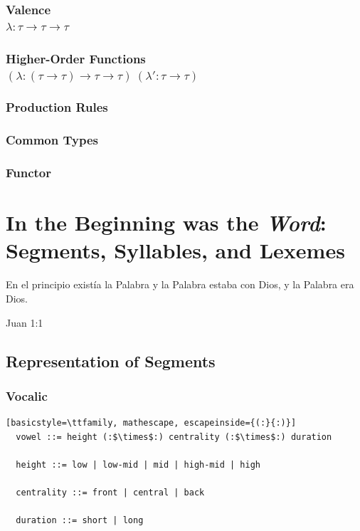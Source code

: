 \documentclass{report}[12pt]
\begin{document}
\subsection*{Valence \\ $\lambda : \tau \rightarrow \tau \rightarrow \tau$}

\subsection*{Higher-Order Functions \\ $(\lambda : (\tau \rightarrow \tau) \rightarrow \tau \rightarrow \tau)\ (\lambda' : \tau \rightarrow \tau)$}

\subsection*{Production Rules}

\subsection*{Common Types}

\subsection*{Functor}

\chapter{In the Beginning was the \emph{Word}: \\ Segments, Syllables, and Lexemes}

\epigraph{En el principio existía la Palabra y la Palabra estaba con Dios, y la Palabra era Dios.}{Juan 1:1}

\section{Representation of Segments}

\subsection{Vocalic}

\begin{lstlisting}[basicstyle=\ttfamily, mathescape, escapeinside={(:}{:)}]
  vowel ::= height (:$\times$:) centrality (:$\times$:) duration

  height ::= low | low-mid | mid | high-mid | high

  centrality ::= front | central | back

  duration ::= short | long
\end{lstlisting}
\end{document}
